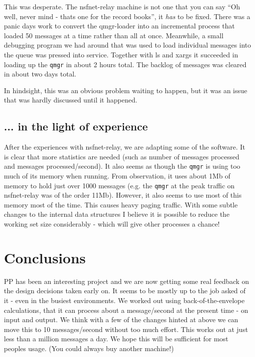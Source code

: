 This was desperate. The nsfnet-relay machine is not one that you can
say ``Oh well, never mind - thats one for the record books'', it {\em
has} to be fixed. There was a panic days work to convert the
qmgr-loader into an incremental process that loaded 50 messages at a
time rather than all at once. Meanwhile, a small debugging program we
had around that was used to load individual messages into the queue
was pressed into service. Together with ls and xargs it succeeded in
loading up the
\verb|qmgr| in about 2 hours total. The backlog of messages was cleared in
about two days total.

In hindsight, this was an obvious problem waiting to happen, but it
was an issue that was hardly discussed until it happened.

\subsection{... in the light of experience}
After the experiences with nsfnet-relay, we are adapting some of the
software. It is clear that more statistics are needed (such as number
of messages processed and messages processed/second). It also seems as
though the \verb|qmgr| is using too much of its memory when running. From
observation, it uses about 1Mb of memory to hold just over 1000
messages (e.g. the \verb|qmgr| at the peak traffic on nsfnet-relay was of the
order 11Mb). However, it also seems to use most of this memory most of
the time. This causes heavy paging traffic. With some subtle changes
to the internal data structures I believe it is possible to reduce the
working set size considerably - which will give other processes a
chance!

\section{Conclusions}
PP has been an interesting project and we are now getting some real
feedback on the design decisions taken early on. It seems to be mostly
up to the job asked of it - even in the busiest environments. We
worked out using back-of-the-envelope calculations, that it can
process about a message/second at the present time - on input and
output. We think with a few of the changes hinted at above we can move
this to 10 messages/second without too much effort. This works out at
just less than a million messages a day. We hope this will be
sufficient for most peoples usage. (You could always buy another machine!) 




\showsummary


